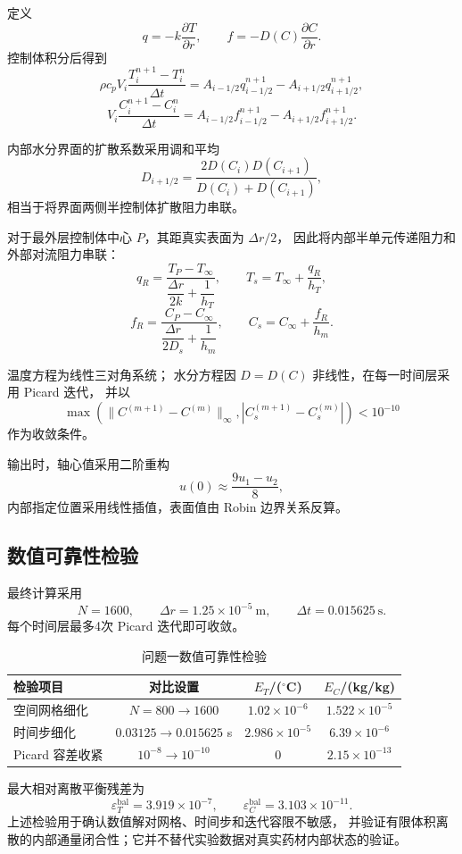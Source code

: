\documentclass[UTF8,a4paper,11pt]{ctexart}
\begin{document}
定义
\[
q=-k\frac{\partial T}{\partial r},
\qquad
f=-D(C)\frac{\partial C}{\partial r}.
\]
控制体积分后得到
\[
\rho c_pV_i
\frac{T_i^{n+1}-T_i^n}{\Delta t}
=
A_{i-1/2}q_{i-1/2}^{n+1}
-
A_{i+1/2}q_{i+1/2}^{n+1},
\]
\[
V_i
\frac{C_i^{n+1}-C_i^n}{\Delta t}
=
A_{i-1/2}f_{i-1/2}^{n+1}
-
A_{i+1/2}f_{i+1/2}^{n+1}.
\]

内部水分界面的扩散系数采用调和平均
\[
D_{i+1/2}
=
\frac{2D(C_i)D(C_{i+1})}
{D(C_i)+D(C_{i+1})},
\]
相当于将界面两侧半控制体扩散阻力串联。

对于最外层控制体中心 $P$，其距真实表面为 $\Delta r/2$，
因此将内部半单元传递阻力和外部对流阻力串联：
\[
q_R=
\frac{T_P-T_\infty}
{\dfrac{\Delta r}{2k}+\dfrac1{h_T}},
\qquad
T_s=T_\infty+\frac{q_R}{h_T},
\]
\[
f_R=
\frac{C_P-C_\infty}
{\dfrac{\Delta r}{2D_s}+\dfrac1{h_m}},
\qquad
C_s=C_\infty+\frac{f_R}{h_m}.
\]

温度方程为线性三对角系统；
水分方程因 $D=D(C)$ 非线性，在每一时间层采用 Picard 迭代，
并以
\[
\max\left(
\|C^{(m+1)}-C^{(m)}\|_\infty,
|C_s^{(m+1)}-C_s^{(m)}|
\right)<10^{-10}
\]
作为收敛条件。

输出时，轴心值采用二阶重构
\[
u(0)\approx\frac{9u_1-u_2}{8},
\]
内部指定位置采用线性插值，表面值由 Robin 边界关系反算。

\subsection{数值可靠性检验}

最终计算采用
\[
N=1600,\qquad
\Delta r=1.25\times10^{-5}\ \mathrm m,\qquad
\Delta t=0.015625\ \mathrm s.
\]
每个时间层最多4次 Picard 迭代即可收敛。

\begin{table}[H]
\centering
\caption{问题一数值可靠性检验}
\begin{tabular}{lccc}
\toprule
检验项目 & 对比设置 & $E_T$/($^\circ$C) & $E_C$/(kg/kg)\\
\midrule
空间网格细化 &
$N=800\rightarrow1600$ &
$1.02\times10^{-6}$ &
$1.522\times10^{-5}$\\
时间步细化 &
$0.03125\rightarrow0.015625$ s &
$2.986\times10^{-5}$ &
$6.39\times10^{-6}$\\
Picard 容差收紧 &
$10^{-8}\rightarrow10^{-10}$ &
$0$ &
$2.15\times10^{-13}$\\
\bottomrule
\end{tabular}
\end{table}

最大相对离散平衡残差为
\[
\varepsilon_T^{\mathrm{bal}}
=3.919\times10^{-7},
\qquad
\varepsilon_C^{\mathrm{bal}}
=3.103\times10^{-11}.
\]
上述检验用于确认数值解对网格、时间步和迭代容限不敏感，
并验证有限体积离散的内部通量闭合性；它并不替代实验数据对真实药材内部状态的验证。
\end{document}
